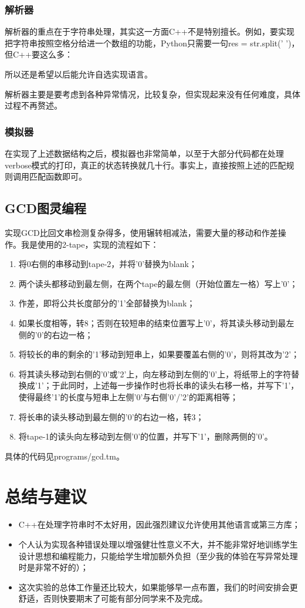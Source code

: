 \documentclass[11pt,a4paper,UTF8]{article}
\begin{document}
\subsubsection{解析器}
解析器的重点在于字符串处理，其实这一方面C++不是特别擅长。例如，要实现把字符串按照空格分给进一个数组的功能，Python只需要一句res = str.split(' ')，但C++要这么多：

所以还是希望以后能允许自选实现语言。
\par 解析器主要是要考虑到各种异常情况，比较复杂，但实现起来没有任何难度，具体过程不再赘述。

\subsubsection{模拟器}
在实现了上述数据结构之后，模拟器也非常简单，以至于大部分代码都在处理verbose模式的打印，真正的状态转换就几十行。事实上，直接按照上述的匹配规则调用匹配函数即可。


\subsection{GCD图灵编程}
实现GCD比回文串检测复杂得多，使用辗转相减法，需要大量的移动和作差操作。我是使用的2-tape，实现的流程如下：
\begin{enumerate}
	\item 将0右侧的串移动到tape-2，并将'0'替换为blank；
	\item 两个读头都移动到最左侧，在两个tape的最左侧（开始位置左一格）写上'0'；
	\item 作差，即将公共长度部分的'1'全部替换为blank；
	\item 如果长度相等，转8；否则在较短串的结束位置写上'0'，将其读头移动到最左侧的'0'的右边一格；
	\item 将较长的串的剩余的'1'移动到短串上，如果要覆盖右侧的'0'，则将其改为'2'；
	\item 将其读头移动到右侧的'0'或'2'上，向左移动到左侧的'0'上，将纸带上的字符替换成'1'；于此同时，上述每一步操作时也将长串的读头右移一格，并写下'1'，使得最终'1'的长度与短串上左侧'0'与右侧'0'/'2'的距离相等；
	\item 将长串的读头移动到最左侧的'0'的右边一格，转3；
	\item 将tape-1的读头向左移动到左侧'0'的位置，并写下'1'，删除两侧的'0'。
\end{enumerate}
具体的代码见programs/gcd.tm。

\section{总结与建议}
\begin{itemize}
	\item C++在处理字符串时不太好用，因此强烈建议允许使用其他语言或第三方库；
	\item 个人认为实现各种错误处理以增强健壮性意义不大，并不能非常好地训练学生设计思想和编程能力，只能给学生增加额外负担（至少我的体验在写异常处理时是非常不好的）；
	\item 这次实验的总体工作量还比较大，如果能够早一点布置，我们的时间安排会更舒适，否则快要期末了可能有部分同学来不及完成。
\end{itemize}
\end{document}
